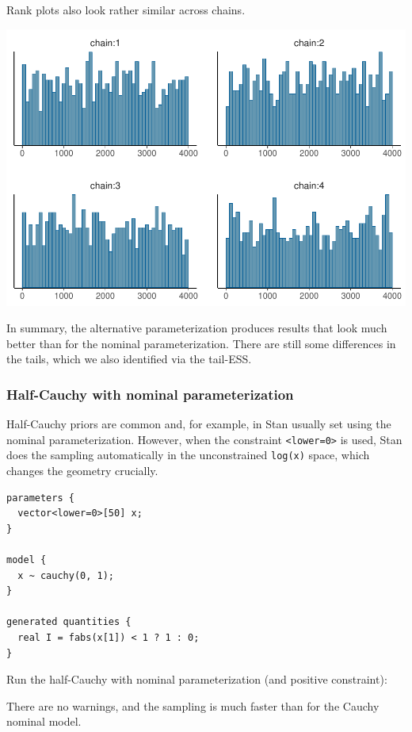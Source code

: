 \documentclass[american,]{article}
\begin{document}
Rank plots also look rather similar across chains.

\includegraphics{graphics/hist-fit-alt1-1.pdf}

In summary, the alternative parameterization produces results that look
much better than for the nominal parameterization. There are still some
differences in the tails, which we also identified via the tail-ESS.

\hypertarget{half-cauchy-with-nominal-parameterization}{%
\subsubsection{Half-Cauchy with nominal
parameterization}\label{half-cauchy-with-nominal-parameterization}}

Half-Cauchy priors are common and, for example, in Stan usually set
using the nominal parameterization. However, when the constraint
\texttt{\textless{}lower=0\textgreater{}} is used, Stan does the
sampling automatically in the unconstrained \texttt{log(x)} space, which
changes the geometry crucially.

\begin{verbatim}
parameters {
  vector<lower=0>[50] x;
}

model {
  x ~ cauchy(0, 1);
}

generated quantities {
  real I = fabs(x[1]) < 1 ? 1 : 0;
}
\end{verbatim}

Run the half-Cauchy with nominal parameterization (and positive
constraint):

There are no warnings, and the sampling is much faster than for the
Cauchy nominal model.
\end{document}
